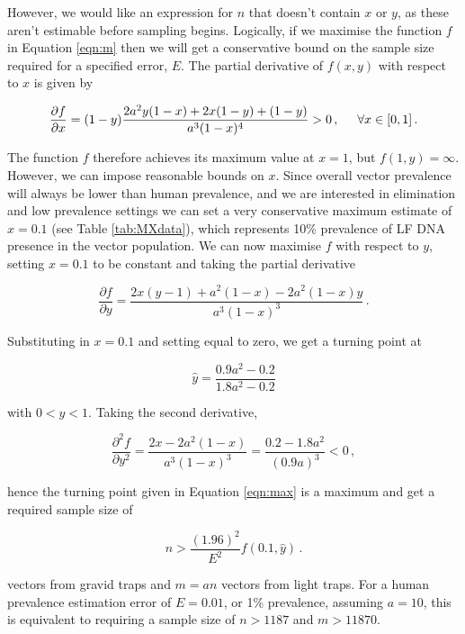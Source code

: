 However, we would like an expression for $n$ that doesn't contain $x$ or $y$, as these aren't estimable before sampling begins. Logically, if we maximise the function $f$ in Equation \ref{eqn:m} then we will get a conservative bound on the sample size required for a specified error, $E$. The partial derivative of $f(x,y)$ with respect to $x$ is given by

\begin{equation}
    \frac{\partial f}{\partial x} = (1-y)\frac{2a^2y(1-x) + 2x(1-y) + (1-y)}{a^3(1-x)^4} > 0\,, \hspace{0.5cm} \forall x\in[0,1]\,.
\end{equation}

The function $f$ therefore achieves its maximum value at $x=1$, but $f(1,y) = \infty$. However, we can impose reasonable bounds on $x$. Since overall vector prevalence will always be lower than human prevalence, and we are interested in elimination and low prevalence settings we can set a very conservative maximum estimate of $x=0.1$ (see Table \ref{tab:MXdata}), which represents 10\% prevalence of LF DNA presence in the vector population. We can now maximise $f$ with respect to $y$, setting $x=0.1$ to be constant and taking the partial derivative

\begin{equation}
    \frac{\partial f}{\partial y} = \frac{2x(y-1)+a^2(1-x)-2a^2(1-x)y}{a^3(1-x)^3} \,.
\end{equation}

Substituting in $x=0.1$ and setting equal to zero, we get a turning point at 

\begin{equation}
    \hat{y} = \frac{0.9a^2-0.2}{1.8a^2 - 0.2}
    \label{eqn:max}
\end{equation}

with $0<\hat{y}<1$. Taking the second derivative,

\begin{equation}
    \frac{\partial^2 f}{\partial y^2} = \frac{2x - 2a^2(1-x)}{a^3(1-x)^3}  = \frac{0.2 - 1.8a^2}{(0.9a)^3} < 0\,,
\end{equation}

hence the turning point given in Equation \ref{eqn:max} is a maximum and get a required sample size of

\begin{equation}
n > \frac{(1.96)^2}{E^2}f(0.1,\hat{y}) \,.
\end{equation}

vectors from gravid traps and $m=an$ vectors from light traps. For a human prevalence estimation error of $E=0.01$, or 1\% prevalence, assuming $a=10$, this is equivalent to requiring a sample size of $n>1187$ and $m>11870$.

